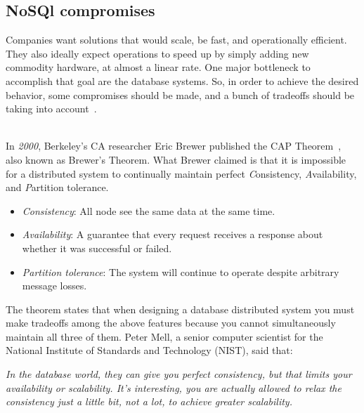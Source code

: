 \subsection{NoSQl compromises}

Companies want solutions that would scale, be fast, and operationally efficient.
They also ideally expect operations to speed up by simply adding new commodity
hardware, at almost a linear rate. One major bottleneck to accomplish that goal
are the database systems. So, in order to achieve the desired behavior, some
compromises should be made, and a bunch of tradeoffs should be taking into
account~\cite{burd}.

\begin{description}\label{item:cap}
  \item[The CAP Theorem] \hfill \\
    In \emph{2000}, Berkeley's CA researcher Eric Brewer published the CAP
    Theorem~, also known as
    Brewer's Theorem. What Brewer claimed is that it is impossible for a
    distributed system to continually maintain perfect \emph{C}onsistency,
    \emph{A}vailability, and \emph{P}artition tolerance.

    \begin{itemize}
      \item \emph{Consistency}: All node see the same data at the same time.
      \item \emph{Availability}: A guarantee that every request receives a
            response about whether it was successful or failed.
      \item \emph{Partition tolerance}: The system will continue to operate
            despite arbitrary message losses.
    \end{itemize}

    The theorem states that when designing a database distributed system you
    must make tradeoffs among the above features because you cannot
    simultaneously maintain all three of them. Peter Mell, a senior computer
    scientist for the National Institute of Standards and Technology (NIST),
    said that:

    \begin{flushright}
      \emph{In the database world, they can give you perfect consistency, but
            that limits your availability or scalability. It’s interesting, you
            are actually allowed to relax the consistency just a little bit, not
            a lot, to achieve greater scalability.}


\end{flushright}
\end{description}
